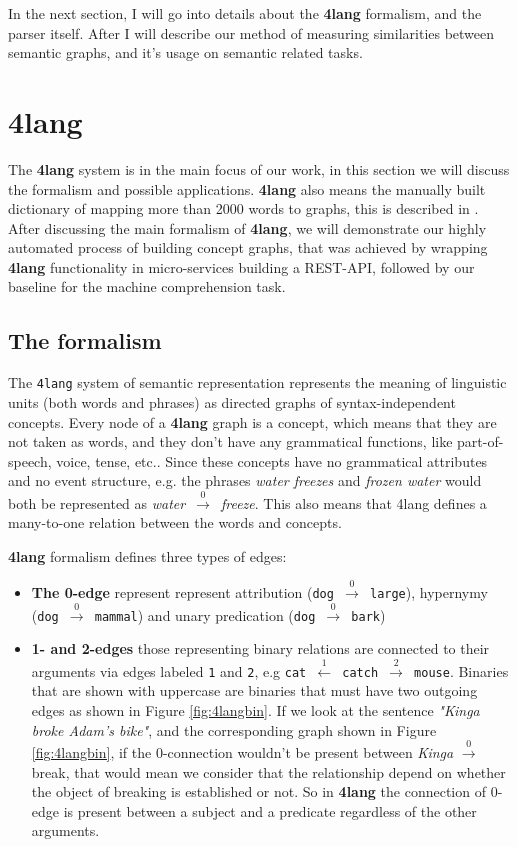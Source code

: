 In the next section, I will go into details about the \textbf{4lang} formalism, and the parser itself. After I will describe our method of measuring similarities between semantic graphs, and it's usage on semantic related tasks.

\section{4lang}
\label{sec:4lang}
The \textbf{4lang} system is in the main focus of our work, in this section we will discuss the formalism and possible applications. \textbf{4lang} also means the manually built dictionary of mapping more than 2000 words to graphs, this is described in \cite{Kornai:2013}. After discussing the main formalism of \textbf{4lang}, we will demonstrate our highly automated process of building concept graphs, that was achieved by wrapping \textbf{4lang} functionality in micro-services building a REST-API, followed by our baseline for the machine comprehension task.

\subsection{The formalism}
The \texttt{4lang} system of semantic representation \cite{Kornai:2015a}
represents the meaning of linguistic units (both words and phrases)
as directed graphs of syntax-independent concepts. Every node of a \textbf{4lang} graph is a concept, which means that they are not taken as words, and they don't have any grammatical functions, like part-of-speech, voice, tense, etc.\cite{Recski:2016}.
Since these concepts have no grammatical attributes and no event structure, e.g.
the phrases \textit{water freezes} and \textit{frozen water} would both be
represented as \textit{water}~$\xrightarrow0$~\textit{freeze}. This also means that 4lang defines a many-to-one relation between the words and concepts. 

\textbf{4lang} formalism defines three types of edges:
\begin{itemize}
	\item \textbf{The 0-edge} represent represent attribution (\texttt{dog
		$\xrightarrow0$ large}), hypernymy (\texttt{dog $\xrightarrow0$ mammal}) and unary predication (\texttt{dog  $\xrightarrow0$ bark})
	\item \textbf{1- and 2-edges} those representing binary relations are connected to their arguments
	via edges labeled \texttt{1} and \texttt{2}, e.g \texttt{cat $\xleftarrow1$ catch $\xrightarrow2$ mouse}. Binaries that are shown with uppercase are binaries that must have two outgoing edges as shown in Figure \ref{fig:4langbin}. If we look at the sentence \textit{"Kinga broke Adam's bike"}, and the corresponding graph shown in Figure \ref{fig:4langbin}, if the 0-connection wouldn't be present between \textit{Kinga} $\xrightarrow0$ break, that would mean we consider that the relationship depend on whether the object of breaking is established or not. So in \textbf{4lang} the connection of 0-edge is present between a subject and a predicate regardless of the other arguments.
\end{itemize}

